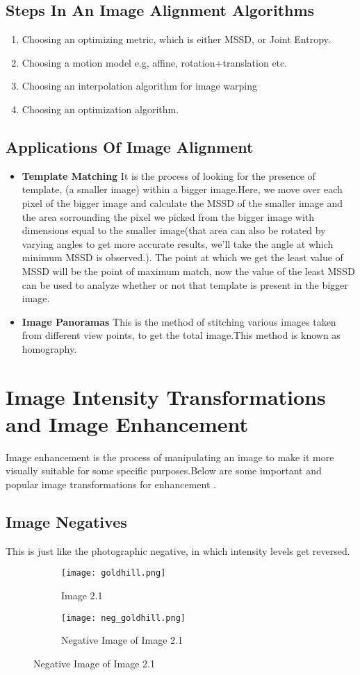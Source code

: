 \documentclass{report}
\begin{document}
\section{Steps In An Image Alignment Algorithms}
\begin{enumerate}
    \item Choosing an optimizing metric, which is either MSSD, or Joint Entropy.
    \item Choosing a motion model e.g, affine, rotation+translation etc.
    \item Choosing an interpolation algorithm for image warping
    \item Choosing an optimization algorithm.
\end{enumerate}
\section{Applications Of Image Alignment}
\begin{itemize}
    \item \textbf{Template Matching} It is the process of looking for the presence of template, (a smaller image) within a bigger image.Here, we move over each pixel of the bigger image and calculate the MSSD of the smaller image and the area sorrounding the pixel we picked from the bigger image with dimensions equal to the smaller image(that area can also be rotated by varying angles to get more accurate results, we'll take the angle at which minimum MSSD is observed.).
    The point at which we get the least value of MSSD will be the point of maximum match, now the value of the least MSSD can be used to analyze whether or not that template is present in the bigger image.
    \item \textbf{Image Panoramas} This is the method of stitching various images taken from different view points, to get the total image.This method is known as homography.
\end{itemize}
\chapter{Image Intensity Transformations and Image Enhancement}
Image enhancement is the process of manipulating an image to make it more visually suitable for some specific purposes.Below are some important and popular image transformations for enhancement .
\section{Image Negatives}
This is just like the photographic negative, in which intensity levels get reversed.
\begin{figure}[h]
    \begin{subfigure}{0.4\textwidth}
    \centering
    \texttt{[image: goldhill.png]}
    \caption{Image 2.1}
    \end{subfigure}
    \begin{subfigure}{0.4\textwidth}
    \centering
    \texttt{[image: neg\_goldhill.png]}
    \caption{Negative Image of Image 2.1}
    \end{subfigure}
\end{figure}
\end{document}
